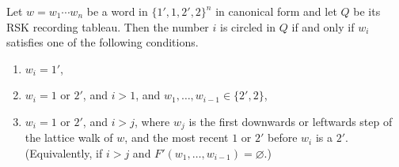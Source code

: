 \documentclass[ALCO,ThmDefs,Unicode,epreuves]{cedram}
\begin{document}
\begin{lemma}\label{lem:circling}
Let $w=w_1\cdots w_n$ be a word in $\{1',1,2',2\}^n$ in canonical form and let $Q$ be its RSK recording tableau. Then the number $i$ is circled in $Q$ if and only if $w_i$ satisfies one of the following conditions.
\begin{enumerate}[label={(\roman*)}]
\item\label{condition1} $w_i=1'$,
\item\label{condition2} $w_i=1$ or $2'$, and $i>1$, and $w_1, \ldots, w_{i-1} \in \{2',2\}$,
\item\label{condition4} $w_i=1$ or $2'$, and $i > j$, where $w_j$ is the first downwards or leftwards step of the lattice walk of $w$, and the most recent $1$ or $2'$ before $w_i$ is a $2'$. \textup{(}Equivalently, if $i > j$ and $F'(w_1, \ldots, w_{i-1}) = \varnothing$.\textup{)}
\end{enumerate}
\end{lemma}
\end{document}
